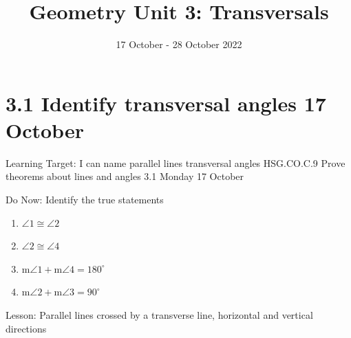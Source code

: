 \documentclass[onlytextwidth, aspectratio=169]{beamer}
\title{Geometry Unit 3: Transversals}
\date{17 October - 28 October 2022}
\begin{document}
\frame{\titlepage}
\section[Outline]{}
\frame{\tableofcontents}

\section{3.1 Identify transversal angles \hfill 17 October \,}
\begin{frame}{Learning Target: I can name parallel lines transversal angles}
  {HSG.CO.C.9 Prove theorems about lines and angles  \hfill \alert{3.1 Monday 17 October}}
  \begin{block}{Do Now: Identify the true statements}
    \begin{multicols}{2}
    \begin{enumerate}
      \item $\angle 1 \cong \angle 2$
      \item $\angle 2 \cong \angle 4$
      \item m$\angle 1 + \text{m}\angle 4=180^\circ$
      \item m$\angle 2 + \text{m}\angle 3=90^\circ$
    \end{enumerate}
    \begin{center}
    \end{center}
  \end{multicols}
  \end{block}
    Lesson: Parallel lines crossed by a transverse line, horizontal and vertical directions
\end{frame}
\end{document}
